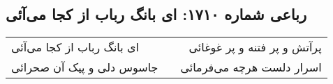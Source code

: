 \begin{center}
\section*{رباعی شماره ۱۷۱۰: ای بانگ رباب از کجا می‌آئی}
\label{sec:1710}
\begin{longtable}{l p{0.5cm} r}
ای بانگ رباب از کجا می‌آئی
&&
پرآتش و پر فتنه و پر غوغائی
\\
جاسوس دلی و پیک آن صحرائی
&&
اسرار دلست هرچه می‌فرمائی
\\
\end{longtable}
\end{center}

